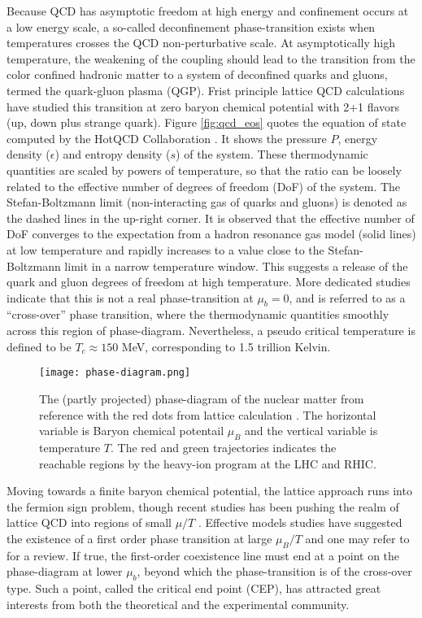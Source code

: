 Because QCD has asymptotic freedom at high energy and confinement occurs at a low energy scale, a so-called deconfinement phase-transition exists when temperatures crosses the QCD non-perturbative scale.
At asymptotically high temperature, the weakening of the coupling should lead to the transition from the color confined hadronic matter to a system of deconfined quarks and gluons, termed the quark-gluon plasma (QGP). 
Frist principle lattice QCD calculations have studied this transition at zero baryon chemical potential with 2+1 flavors (up, down plus strange quark).
Figure \ref{fig:qcd_eos} quotes the equation of state computed by the HotQCD Collaboration \cite{Bazavov:2014pvz}.
It shows the pressure $P$, energy density ($\epsilon$) and entropy density ($s$) of the system.
These thermodynamic quantities are scaled by powers of temperature, so that the ratio can be loosely related to the effective number of degrees of freedom (DoF) of the system.
The Stefan-Boltzmann limit (non-interacting gas of quarks and gluons) is denoted as the dashed lines in the up-right corner.
It is observed that the effective number of DoF converges to the expectation from a hadron resonance gas model (solid lines) at low temperature and rapidly increases to a value close to the Stefan-Boltzmann limit in a narrow temperature window.
This suggests a release of the quark and gluon degrees of freedom at high temperature.
More dedicated studies indicate that this is not a real phase-transition at $\mu_b = 0$, and is referred to as a ``cross-over'' phase transition, where the thermodynamic quantities smoothly across this region of phase-diagram.
Nevertheless, a pseudo critical temperature is defined to be $T_c \approx 150 $ MeV, corresponding to 1.5 trillion Kelvin.

\begin{figure}
    \centering
    \texttt{[image: phase-diagram.png]}
    \caption{The (partly projected) phase-diagram of the nuclear matter from reference \cite{Geesaman:2015fha} with the red dots from lattice calculation \cite{PhysRevLett.109.192302}. The horizontal variable is Baryon chemical potentail $\mu_B$ and the vertical variable is temperature $T$. The red and green trajectories indicates the reachable regions by the heavy-ion program at the LHC and RHIC.}
    \label{fig:phase-diagram}
\end{figure}

Moving towards a finite baryon chemical potential, the lattice approach runs into the fermion sign problem, though recent studies has been pushing the realm of lattice QCD into regions of small $\mu/T$  \cite{Gunther:2016vcp,Bazavov:2017dus}.
Effective models studies have suggested the existence of a first order phase transition at large $\mu_B/T$ and one may refer to \cite{Fukushima:2010bq} for a review.
If true, the first-order coexistence line must end at a point on the phase-diagram at lower $\mu_b$, beyond which the phase-transition is of the cross-over type.
Such a point, called the critical end point (CEP), has attracted great interests from both the theoretical and the experimental community.

